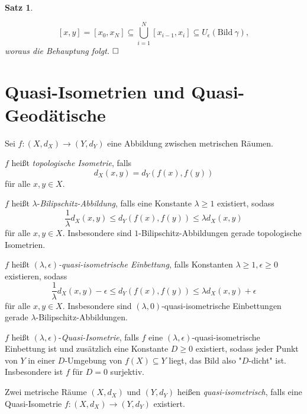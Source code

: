 \documentclass[11pt]{book}
\numberwithin{dummy}{section}
\newtheorem{theorem}{Satz}[section]
\theoremstyle{nonumberbreak}
\newenvironment{defin}[1][]{\ifthenelse{\equal{#1}{}}{\definition}{\definition[#1]}\rm}{\enddefinition}
\newenvironment{pr}[1][]{\ifthenelse{\equal{#1}{}}{\proof}{\proof[#1]}\rm}{\endproof}
\newcommand{\la}{\longrightarrow}
\begin{document}
\begin{spacing}{1.4}
\begin{theorem}
\begin{pr}
\begin{compactenum}
\begin{compactenum}
$$[x,y] = [x_0,x_N] \subseteq \bigcup_{i=1}^N [x_{i-1},x_i] \subseteq U_{\epsilon} \left( \mathrm{Bild} \ \gamma \right),$$
woraus die Behauptung folgt. $\hfill \Box$
\end{compactenum}


\end{compactenum}
\end{pr}

\end{theorem}







 



\section{Quasi-Isometrien und Quasi-Geodätische} %


\begin{defin}

Sei $f:(X,d_X) \la (Y,d_Y)$ eine Abbildung zwischen metrischen Räumen.
\begin{compactenum}
\item $f$ heißt \textit{topologische Isometrie}, falls 
$$d_X(x,y) = d_Y(f(x), f(y))$$
für alle $x,y \in X$.
\item $f$ heißt $\lambda$-\textit{Bilipschitz-Abbildung}, falls eine Konstante $\lambda \geqslant1$ existiert, sodass
$$\frac{1}{\lambda} d_X(x,y) \leqslant d_Y(f(x), f(y)) \leqslant \lambda d_X(x,y)$$
für alle $x,y \in X$.  Insbesondere sind $1$-Bilipschitz-Abbildungen gerade topologische Isometrien.
\item $f$ heißt $(\lambda, \epsilon)$\textit{-quasi-isometrische Einbettung}, falls Konstanten $\lambda \geqslant1, \epsilon \geqslant 0$ existieren, sodass
$$\frac{1}{\lambda} d_X(x,y) - \epsilon \leqslant d_Y(f(x), f(y)) \leqslant \lambda d_X(x,y) + \epsilon$$
für alle $x,y \in X$. Insbesondere sind $(\lambda,0)$-quasi-isometrische Einbettungen gerade $\lambda$-Bilipschitz-Abbildungen.
\item $f$ heißt $(\lambda, \epsilon)$-\textit{Quasi-Isometrie}, falls $f$ eine $(\lambda,\epsilon)$-quasi-isometrische Einbettung ist und zusätzlich eine Konstante $D \geqslant 0$ existiert, sodass jeder Punkt von $Y$ in einer $D$-Umgebung von $f(X) \subseteq Y$ liegt, das Bild also "$D$-dicht" ist. Insbesondere ist $f$ für $D=0$ surjektiv.

\item Zwei metrische Räume $(X,d_X)$ und $(Y,d_Y)$ heißen \textit{quasi-isometrisch}, falls eine Quasi-Isometrie $f: (X,d_X) \la (Y,d_Y)$ existiert.


\end{compactenum}
\end{defin}
\end{spacing}
\end{document}
